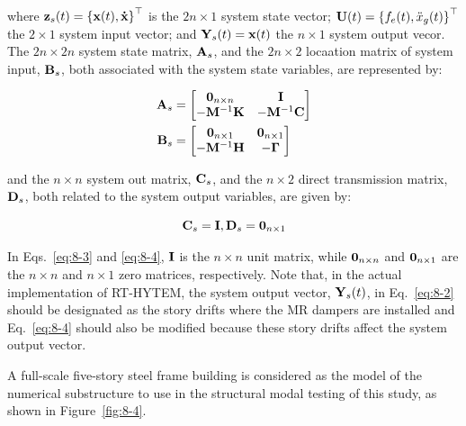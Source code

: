 where $\mathbf{z}_{s}(t) = \left\{\mathbf{x}(t), \mathbf{\dot{x}}\right\}^{\top}$ is the $2n \times 1$ system state vector; $\mathbf{U}(t) = \left\{f_{e}(t),\ddot{x}_{g}(t)\right\}^{\top}$ the $2\times1$ system input vector; and $\mathbf{Y}_{s}(t)=\mathbf{x}(t)$ the $n\times1$ system output vecor. The $2n\times2n$ system state matrix, $\mathbf{A}_{s}$, and the $2n\times2$ locaation matrix of system input, $\mathbf{B}_{s}$, both associated with the system state variables, are represented by:

\begin{equation}\label{eq:8-3}
\begin{aligned}
\mathbf{A}_{s} &= \begin{bmatrix} \mathbf{0}_{n\times n} & \mathbf{I} \\ -\mathbf{M}^{-1}\mathbf{K} & -\mathbf{M}^{-1}\mathbf{C}\end{bmatrix} \\
\mathbf{B}_{s} &= \begin{bmatrix} \mathbf{0}_{n\times1} & \mathbf{0}_{n\times1} \\ -\mathbf{M}^{-1}\mathbf{H} & -\mathbf{\Gamma} \end{bmatrix}
\end{aligned}
\end{equation}

and the $n\times n$ system out matrix, $\mathbf{C}_{s}$, and the $n\times2$ direct transmission matrix, $\mathbf{D}_{s}$, both related to the system output variables, are given by:

\begin{equation}\label{eq:8-4}
\mathbf{C}_{s} = \mathbf{I}, \mathbf{D}_{s} = \mathbf{0}_{n\times1}
\end{equation}

In Eqs.~\eqref{eq:8-3} and \eqref{eq:8-4}, $\mathbf{I}$ is the $n\times n$ unit matrix, while $\mathbf{0}_{n\times n}$ and $\mathbf{0}_{n\times1}$ are the $n\times n$ and $n\times1$ zero matrices, respectively. Note that, in the actual implementation of RT-HYTEM, the system output vector, $\mathbf{Y}_{s}(t)$, in Eq.~\eqref{eq:8-2} should be designated as the story drifts where the MR dampers are installed and Eq.~\eqref{eq:8-4} should also be modified because these story drifts affect the system output vector.

A full-scale five-story steel frame building is considered as the model of the numerical substructure to use in the structural modal testing of this study, as shown in Figure~\ref{fig:8-4}. 

